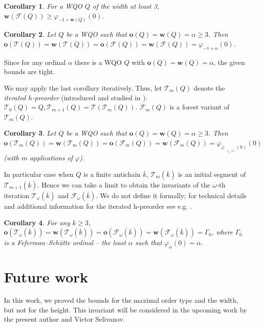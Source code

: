 \documentclass[runningheads]{llncs}
\let \geq \geqslant
\let \phi \varphi
\def \T {\mathcal{T}}
\def \F {\mathcal{F}}
\def \o {\textbf{o}}
\def \w {\textbf{w}}
\newtheorem{corollary}{Corollary}
\begin{document}
\begin{corollary}
    For a WQO $Q$ of the width at least 3, $\w(\F(Q)) \geq \phi_{-1+\w(Q)}(0)$.
\end{corollary}

\begin{corollary}
    Let $Q$ be a WQO such that $\o(Q) = \w(Q) = \alpha \geq 3$. Then $\o(\T(Q)) = \w(\T(Q)) = \o(\F(Q)) = \w(\F(Q)) = \phi_{-1+\alpha}(0)$.
\end{corollary}

Since for any ordinal $\alpha$ there is a WQO $Q$ with $\o(Q) = \w(Q) = \alpha$, the given bounds are tight.

We may apply the last corollary iteratively. Thus, let $\T_m(Q)$ denote the \textit{iterated $h$-preorder} (introduced and studied in \cite{Selivanov2011}): $\T_0(Q) = Q, \T_{m+1}(Q) = \T(\T_m(Q))$. $\F_m(Q)$ is a forest variant of $\T_m(Q)$.

\begin{corollary}
    Let $Q$ be a WQO such that $\o(Q) = \w(Q) = \alpha \geq 3$. Then $\o(\T_m(Q)) = \w(\T_m(Q)) = \o(\F_m(Q)) = \w(\F_m(Q)) = \phi_{\phi_{\dots_{\phi_\alpha(0)}}(0)}(0)$ (with $m$ applications of $\phi$).
\end{corollary}

In particular case when $Q$ is a finite antichain $\overline{k}$, $\T_m\left(\overline{k}\right)$ is an initial segment of $\T_{m+1}\left(\overline{k}\right)$. Hence we can take a limit to obtain the invariants of the $\omega$-th iteration $\T_\omega\left(\overline{k}\right)$ and $\F_\omega\left(\overline{k}\right)$. We do not define it formally; for technical details and additional information for the iterated h-preorder see e.g. \cite{Selivanov2011,Selivanov2022,Alaev2025}.

\begin{corollary}
    For any $k \geq 3$, $\o(\T_\omega\left(\overline{k}\right)) = \w(\T_\omega\left(\overline{k}\right)) = \o(\F_\omega\left(\overline{k}\right)) = \w(\F_\omega\left(\overline{k}\right)) = \Gamma_0$, where $\Gamma_0$ is a Feferman–Schütte ordinal -- the least $\alpha$ such that $\phi_\alpha(0) = \alpha$.
\end{corollary}

\section{Future work}

In this work, we proved the bounds for the maximal order type and the width, but not for the height. This invariant will be considered in the upcoming work by the present author and Victor Selivanov.
\end{document}
